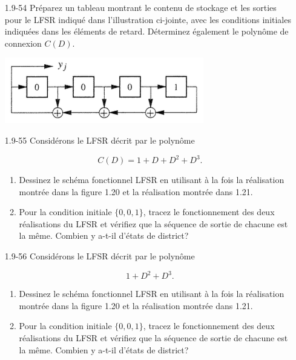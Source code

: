 \documentclass[10pt,twoside,a4paper]{book}
\begin{document}
\begin{enumerate}
  \item[1.9-54] Préparez un tableau montrant le contenu de stockage et les sorties pour le LFSR indiqué dans l'illustration ci-jointe, avec les conditions initiales indiquées dans les éléments de retard. Déterminez également le polynôme de connexion $C(D)$.
  \begin{center}
    \includegraphics[scale=0.6]{fig1.1}
  \end{center}

  \item[1.9-55] Considérons le LFSR décrit par le polynôme
  
  \begin{equation*}
    C(D) = 1 + D + D^2 + D^3.
  \end{equation*}

  \begin{enumerate}
    \item Dessinez le schéma fonctionnel LFSR en utilisant à la fois la réalisation montrée dans la figure 1.20 et la réalisation montrée dans 1.21.
    \item Pour la condition initiale $\{0, 0, 1\}$, tracez le fonctionnement des deux réalisations du LFSR et vérifiez que la séquence de sortie de chacune est la même. Combien y a-t-il d'états de district?
  \end{enumerate}

  \item[1.9-56] Considérons le LFSR décrit par le polynôme
  
  \begin{equation*}
    1 + D^2 + D^3.
  \end{equation*}

  \begin{enumerate}
    \item Dessinez le schéma fonctionnel LFSR en utilisant à la fois la réalisation montrée dans la figure 1.20 et la réalisation montrée dans 1.21.
    \item Pour la condition initiale $\{0, 0, 1\}$, tracez le fonctionnement des deux réalisations du LFSR et vérifiez que la séquence de sortie de chacune est la même. Combien y a-t-il d'états de district?
  \end{enumerate}


\end{enumerate}
\end{document}
